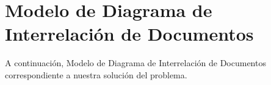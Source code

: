 \section{Modelo de Diagrama de Interrelación de Documentos}

A continuación, Modelo de Diagrama de Interrelación de Documentos correspondiente a nuestra solución del problema.\\

